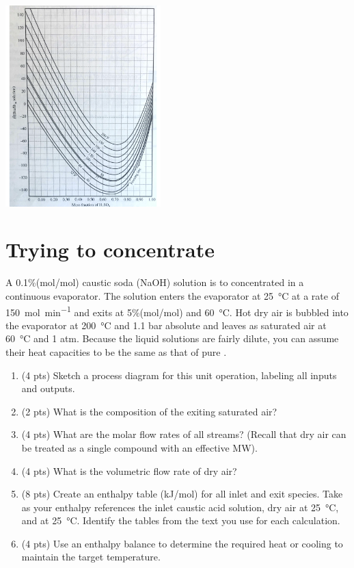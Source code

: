 \documentclass[11pt]{article}
\begin{document}
\begin{center}
\includegraphics[width=0.45\textwidth]{../../figs/H2SO4-Enthalpy.png}
\end{center}


\section{Trying to concentrate}
\label{sec-2}
A 0.1\%(mol/mol) caustic soda (NaOH) solution is to concentrated in a continuous evaporator. The solution enters the evaporator at \SI{25}{\celsius} at a rate of \SI{150}{\mole\per\minute} and exits at 5\%(mol/mol) and \SI{60}{\celsius}.  Hot dry air is bubbled into the evaporator at \SI{200}{\celsius} and 1.1 bar absolute and leaves as saturated air at \SI{60}{\celsius} and 1 atm. Because the liquid solutions are fairly dilute, you can assume their heat capacities to be the same as that of pure .

\begin{enumerate}
\item (4 pts) Sketch a process diagram for this unit operation, labeling all inputs and outputs.
\item (2 pts) What is the composition of the exiting saturated air?
\item (4 pts) What are the molar flow rates of all streams? (Recall that dry air can be treated as a single compound with an effective MW).
\item (4 pts) What is the volumetric flow rate of dry air?
\item (8 pts) Create an enthalpy table (kJ/mol) for all inlet and exit species.  Take as your enthalpy references the inlet caustic acid solution, dry air at \SI{25}{\celsius}, and  at \SI{25}{\celsius}. Identify the tables from the text you use for each calculation.
\item (4 pts) Use an enthalpy balance to determine the required heat or cooling to maintain the target temperature.
\end{enumerate}
\end{document}
